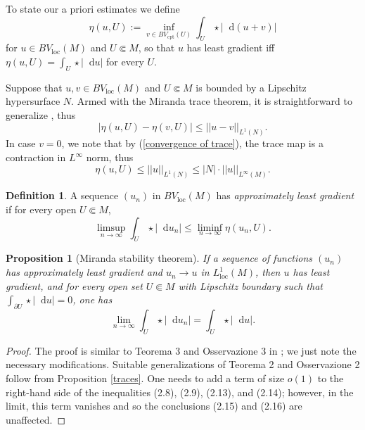 \documentclass[reqno,12pt,letterpaper]{amsart}
\newcommand*\dif{\mathop{}\!\mathrm{d}}
\newcommand{\dfn}[1]{\emph{#1}\index{#1}}
\newcommand{\loc}{\mathrm{loc}}
\newcommand{\cpt}{\mathrm{cpt}}
\newtheorem{proposition}[theorem]{Proposition}
\theoremstyle{definition}
\newtheorem{definition}[theorem]{Definition}
\numberwithin{equation}{section}
\begin{document}
To state our a priori estimates we define
$$\eta(u, U) := \inf_{v \in BV_\cpt(U)} \int_U \star |\dif(u + v)|$$
for $u \in BV_\loc(M)$ and $U \Subset M$, so that $u$ has least gradient iff $\eta(u, U) = \int_U \star |\dif u|$ for every $U$.

Suppose that $u, v \in BV_\loc(M)$ and $U \Subset M$ is bounded by a Lipschitz hypersurface $N$. Armed with the Miranda trace theorem, it is straightforward to generalize \cite[Lemma 5.6]{Giusti77}, thus
\begin{equation}
|\eta(u, U) - \eta(v, U)| \leq ||u - v||_{L^1(N)}. \label{a priori estimate 1}
\end{equation}
In case $v = 0$, we note that by (\ref{convergence of trace}), the trace map is a contraction in $L^\infty$ norm, thus
\begin{equation}
\eta(u, U) \leq ||u||_{L^1(N)} \leq |N| \cdot ||u||_{L^\infty(M)}. \label{a priori estimate 2}
\end{equation}

\begin{definition}
A sequence $(u_n)$ in $BV_\loc(M)$ has \dfn{approximately least gradient} if for every open $U \Subset M$,
$$\limsup_{n \to \infty} \int_U \star |\dif u_n| \leq \liminf_{n \to \infty} \eta(u_n, U).$$
\end{definition}

\begin{proposition}[Miranda stability theorem]\label{Miranda convergence}
If a sequence of functions $(u_n)$ has approximately least gradient and $u_n \to u$ in $L^1_\loc(M)$, then $u$ has least gradient, and for every open set $U \Subset M$ with Lipschitz boundary such that $\int_{\partial U} \star |\dif u| = 0$, one has
\begin{equation}\label{convergence in total variation}
\lim_{n \to \infty} \int_U \star |\dif u_n| = \int_U \star |\dif u|.
\end{equation}
\end{proposition}
\begin{proof}
The proof is similar to Teorema 3 and Osservazione 3 in \cite{Miranda67}; we just note the necessary modifications.
Suitable generalizations of Teorema 2 and Osservazione 2 follow from Proposition \ref{traces}.
One needs to add a term of size $o(1)$ to the right-hand side of the inequalities (2.8), (2.9), (2.13), and (2.14); however, in the limit, this term vanishes and so the conclusions (2.15) and (2.16) are unaffected.
\end{proof}
\end{document}
